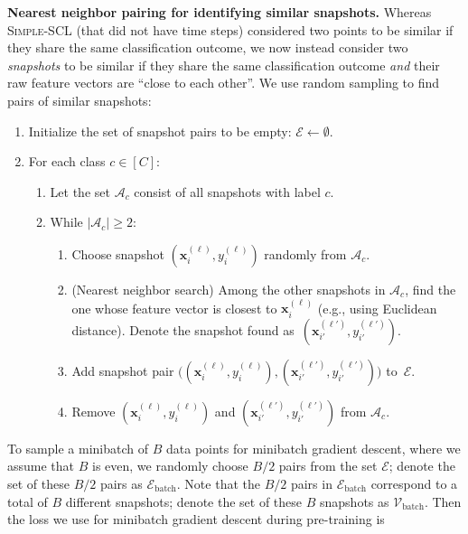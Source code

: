 \documentclass[pmlr,twocolumn,10pt]{jmlr} %
\begin{document}
\vspace{.2em}
\noindent
\textbf{Nearest neighbor pairing for identifying similar snapshots.}
\label{sec:nearest-neighbor-refinement}
%  
Whereas \textsc{Simple-SCL} (that did not have time steps) considered two points to be similar if they share the same classification outcome, we now instead consider two \emph{snapshots} to be similar if they share the same classification outcome \emph{and} their raw feature vectors are ``close to each other''. We use random sampling to find pairs of similar snapshots:
\begin{enumerate}[leftmargin=*,itemsep=0pt,topsep=1pt,parsep=0pt]
\small
\item Initialize the set of snapshot pairs to be empty: $\mathcal{E} \leftarrow \emptyset$.
\item For each class $c\in[C]$:
\begin{enumerate}[leftmargin=8pt,itemsep=0pt,topsep=0pt,parsep=0pt]
\item 
Let the set $\mathcal{A}_c$ consist of all snapshots with label $c$.
\item While $|\mathcal{A}_c| \ge 2$:
\begin{enumerate}[leftmargin=10pt,itemsep=0pt,topsep=0pt,parsep=0pt]
\item Choose snapshot $(\mathbf{x}_i^{(\ell)}, y_i^{(\ell)})$ randomly from $\mathcal{A}_c$.
\item (Nearest neighbor search) Among the other snapshots in $\mathcal{A}_c$, find the one whose feature vector is closest to $\mathbf{x}_i^{(\ell)}$ (e.g., using Euclidean distance). Denote the snapshot found as~$(\mathbf{x}_{i'}^{(\ell')}, y_{i'}^{(\ell')})$.
\item Add snapshot pair $\big((\mathbf{x}_i^{(\ell)}, y_i^{(\ell)}),(\mathbf{x}_{i'}^{(\ell')}, y_{i'}^{(\ell')})\big)$ to~$\mathcal{E}$.
\item Remove $(\mathbf{x}_i^{(\ell)}, y_i^{(\ell)})$ and $(\mathbf{x}_{i'}^{(\ell')}, y_{i'}^{(\ell')})$ from $\mathcal{A}_c$.
\end{enumerate}
\end{enumerate}
\end{enumerate}
To sample a minibatch of $B$ data points for minibatch gradient descent, where we assume that $B$ is even, we randomly choose $B/2$ pairs from the set $\mathcal{E}$; denote the set of these $B/2$ pairs as $\mathcal{E}_{\text{batch}}$. Note that the $B/2$ pairs in $\mathcal{E}_{\text{batch}}$ correspond to a total of $B$ different snapshots; denote the set of these $B$ snapshots as $\mathcal{V}_{\text{batch}}$. Then the loss we use for minibatch gradient descent during pre-training is
\end{document}
